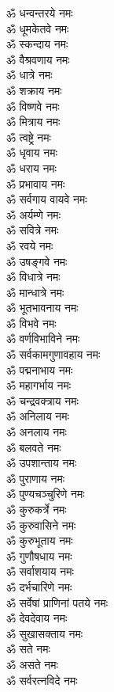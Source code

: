 \begin{multicols}{2}
\begin{flushleft}
ॐ धन्वन्तरये नमः\\
ॐ धूमकेतवे नमः\\
ॐ स्कन्दाय नमः\\
ॐ वैश्रवणाय नमः\\
ॐ धात्रे नमः\\
ॐ शक्राय नमः\hfill{}\\
ॐ विष्णवे नमः\\
ॐ मित्राय नमः\\
ॐ त्वष्ट्रे नमः\\
ॐ धृवाय नमः\\
ॐ धराय नमः\\
ॐ प्रभावाय नमः\\
ॐ सर्वगाय वायवे नमः\\
ॐ अर्यम्णे नमः\\
ॐ सवित्रे नमः\\
ॐ रवये नमः\hfill{}\\
ॐ उषङ्गवे नमः\\
ॐ विधात्रे नमः\\
ॐ मान्धात्रे नमः\\
ॐ भूतभावनाय नमः\\
ॐ विभवे नमः\\
ॐ वर्णविभाविने नमः\\
ॐ सर्वकामगुणावहाय नमः\\
ॐ पद्मनाभाय नमः\\
ॐ महागर्भाय नमः\\
ॐ चन्द्रवक्त्राय नमः\hfill{}\\
ॐ अनिलाय नमः\\
ॐ अनलाय नमः\\
ॐ बलवते नमः\\
ॐ उपशान्ताय नमः\\
ॐ पुराणाय नमः\\
ॐ पुण्यचञ्चुरिणे नमः\\
ॐ कुरुकर्त्रे नमः\\
ॐ कुरुवासिने नमः\\
ॐ कुरुभूताय नमः\\
ॐ गुणौषधाय नमः\hfill{}\\
ॐ सर्वाशयाय नमः\\
ॐ दर्भचारिणे नमः\\
ॐ सर्वेषां प्राणिनां पतये नमः\\
ॐ देवदेवाय नमः\\
ॐ सुखासक्ताय नमः\\
ॐ सते नमः\\
ॐ असते नमः\\
ॐ सर्वरत्नविदे नमः\\

\end{flushleft}
\end{multicols}

